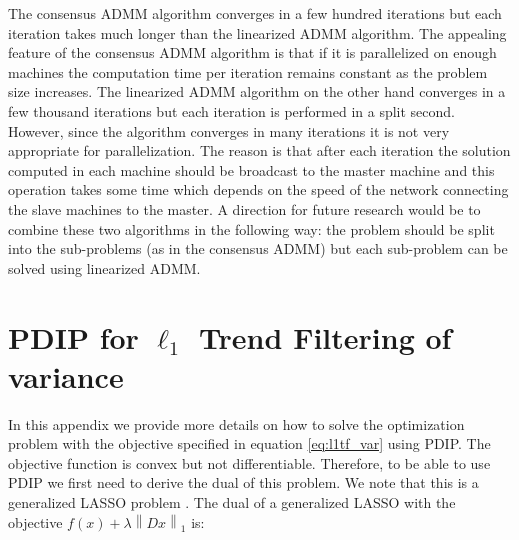 \documentclass[letterpaper]{article} %
\newcommand{\citep}{\cite}
\newcommand{\attn}[1]{\textcolor{red}{TODO: #1}}
\newcommand{\norm}[1]{\left\lVert #1 \right\rVert}
\begin{document}
The consensus ADMM algorithm converges in a few hundred iterations
but each iteration takes much longer than the linearized ADMM
algorithm. The appealing feature of the consensus ADMM algorithm is
that if it is parallelized on enough machines the
computation time per iteration remains constant as the problem size
increases. The linearized ADMM algorithm on the other hand converges
in a few thousand iterations but each iteration is performed in a
split second. However, since the algorithm converges in many
iterations it is not very appropriate for parallelization. The reason
is that after each iteration the solution computed in each machine
should be broadcast to the master machine and this operation takes
some time which depends on the speed of the network connecting the
slave machines to the master. A direction for future research would be
to combine these two algorithms in the following way: the problem
should be split into the sub-problems (as in the consensus ADMM) but
each sub-problem can be solved using linearized ADMM. 



\fontsize{9.0pt}{10.0pt} \selectfont


\clearpage

\appendix
\section{PDIP for $\ell_1$ Trend Filtering of variance}
\label{sec:app_l1tf_var}

In this appendix we provide more details on how to solve the optimization problem with the objective specified in equation \ref{eq:l1tf_var} using PDIP. The objective function is convex but not differentiable. Therefore, to be able to use PDIP we first need to derive the dual of this problem. We note that this is a generalized LASSO problem \citep{TibshiraniTaylor2011}. The dual of a generalized LASSO with the objective $f(x)+\lambda \norm{ Dx }_1$ is:  
\end{document}
